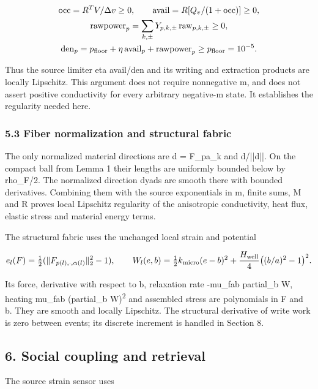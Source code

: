\documentclass[11pt,a4paper]{article}
\begin{document}
\[
\begin{gathered}
\mathrm{occ}=R^TV/\Delta v\ge0,\qquad
\mathrm{avail}=R[Q_v/(1+\mathrm{occ})]\ge0,\\
\mathrm{rawpower}_p=\sum_{k,\pm}Y_{p,k,\pm}\operatorname{raw}_{p,k,\pm}\ge0,\\
\mathrm{den}_p=p_{\rm floor}+\eta\,\mathrm{avail}_p+\mathrm{rawpower}_p
\ge p_{\rm floor}=10^{-5}.
\end{gathered}
\]



Thus the source limiter eta avail/den and its writing and extraction products are locally Lipschitz. This argument does not require nonnegative m, and does not assert positive conductivity for every arbitrary negative-m state. It establishes the regularity needed here.

\subsubsection*{5.3 Fiber normalization and structural fabric}

The only normalized material directions are d = F\_pa\_k and d/||d||. On the compact ball from Lemma 1 their lengths are uniformly bounded below by rho\_F/2. The normalized direction dyads are smooth there with bounded derivatives. Combining them with the source exponentials in m, finite sums, M and R proves local Lipschitz regularity of the anisotropic conductivity, heat flux, elastic stress and material energy terms.

The structural fabric uses the unchanged local strain and potential



\[
e_l(F)=\tfrac12(\|F_{p(l),\cdot,\alpha(l)}\|_2^2-1),\qquad
W_l(e,b)=\tfrac12 k_{\rm micro}(e-b)^2
+\frac{H_{\rm well}}4\bigl((b/a)^2-1\bigr)^2.
\]



Its force, derivative with respect to b, relaxation rate -mu\_fab partial\_b W, heating mu\_fab (partial\_b W)\textsuperscript{2} and assembled stress are polynomials in F and b. They are smooth and locally Lipschitz. The structural derivative of write work is zero between events; its discrete increment is handled in Section 8.

\subsection*{6. Social coupling and retrieval}

The source strain sensor uses
\end{document}
